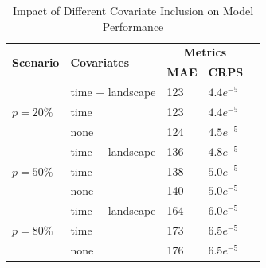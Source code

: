 \documentclass[11pt]{article}
\begin{document}
\begin{table}[ht]
\centering
\begin{tabular}{|l|l|l|l|l|}
\hline
\multirow{2}{*}{\textbf{Scenario}} & \multirow{2}{*}{\textbf{Covariates}} & \multicolumn{2}{c|}{\textbf{Metrics}} \\ \cline{3-4} 
                                   &                                  & \textbf{MAE} & \textbf{CRPS} \\ \hline
\multirow{3}{*}{$p=20\%$} & time + landscape                        &123                   &    $4.4e^{-5}$               \\ \cline{2-4} 
                                   & time                        &    123              &   $4.4e^{-5}$                \\ \cline{2-4} 
                                   & none                        &     124              &      $4.5e^{-5}$             \\ \hline
\multirow{3}{*}{$p=50\%$} & time + landscape                        & 136                  &      $4.8e^{-5}$             \\ \cline{2-4} 
                                   & time                        &    138              &    $5.0e^{-5}$               \\ \cline{2-4} 
                                   & none                       &    140               &    $5.0e^{-5}$           \\ \hline
\multirow{3}{*}{$p=80\%$} & time + landscape                        & 164                  &         $6.0e^{-5}$          \\ \cline{2-4} 
                                   & time                        &   173               &   $6.5e^{-5}$               \\ \cline{2-4} 
                                   & none                        &     176             &      $6.5e^{-5}$            \\ \hline
\end{tabular}
\caption{Impact of Different Covariate Inclusion on Model Performance}
\label{tab: Impact of Different Covariate Inclusion on Model Performance}
\end{table}
\end{document}

